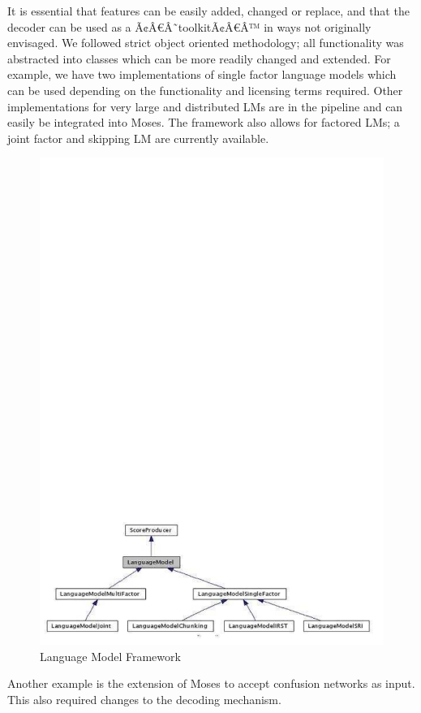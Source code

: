 \documentclass[10pt]{report}
\theoremstyle{plain}
\begin{document}
{It is essential that features can be easily added, changed or replace, and that the decoder can be used as a Ã¢Â€Â˜toolkitÃ¢Â€Â™ in ways not originally envisaged. We followed strict object oriented methodology; all functionality was abstracted into classes which can be more readily changed and extended. For example, we have two implementations of single factor language models which can be used depending on the functionality and licensing terms required. Other implementations for very large and distributed LMs are in the pipeline and can easily be integrated into Moses. The framework also allows for factored LMs; a joint factor and skipping LM are currently available.\\
\begin{center}
\begin{figure}[h]
\centering
\includegraphics[scale=1]{hieu-2}
\caption{Language Model Framework}
\end{figure}
\end{center}
Another example is the extension of Moses to accept confusion networks as input. This also required changes to the decoding mechanism.\\

}
\end{document}
